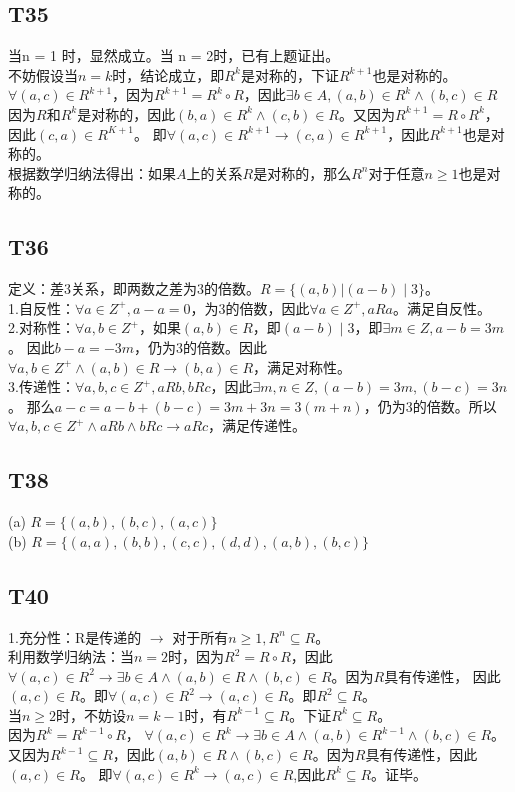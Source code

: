 \documentclass{article}
\begin{document}
\subsection{T35}
当n = 1 时，显然成立。当 n = 2时，已有上题证出。\\
不妨假设当$n = k$时，结论成立，即$R^k$是对称的，下证$R^{k + 1}$也是对称的。\\
$\forall (a, c) \in R^{k + 1}$，因为$R^{k + 1} = R^{k} \circ R$，因此$\exists b \in A, (a ,b) \in R^k \land (b, c) \in R$
因为$R$和$R^k$是对称的，因此$(b, a) \in R^k \land (c, b) \in R$。又因为$R^{k + 1} = R \circ R^k$，因此$(c, a) \in R^{K + 1}$。
即$\forall (a, c) \in R^{k + 1} \rightarrow (c, a) \in R^{k + 1}$，因此$R^{k + 1}$也是对称的。\\
根据数学归纳法得出：如果$A$上的关系$R$是对称的，那么$R^n$对于任意$n \geq 1$也是对称的。
\subsection{T36}
定义：差3关系，即两数之差为3的倍数。$R = \{(a, b) | (a - b) \mid 3\}$。\\
1.自反性：$\forall a \in Z^{+}, a - a = 0$，为3的倍数，因此$\forall a \in Z^{+}, a R a$。满足自反性。\\
2.对称性：$\forall a, b \in Z^{+}$，如果$(a, b) \in R$，即$(a - b) \mid 3$，即$\exists m \in Z, a - b = 3m$。
因此$b - a = -3m$，仍为3的倍数。因此$\forall a, b \in Z^{+} \land (a, b)\in R \rightarrow (b, a) \in R$，满足对称性。\\
3.传递性：$\forall a, b, c \in Z^{+}, a R b, b R c$，因此$\exists m, n\in Z, (a - b) = 3m, (b - c) = 3n$。
那么$a - c = a - b + (b - c) = 3m + 3n = 3(m + n)$，仍为3的倍数。所以$\forall a, b, c \in Z^{+} \land aRb \land bRc 
\rightarrow a R c$，满足传递性。
\subsection{T38}
(a) $R = \{(a, b), (b, c), (a, c)\}$\\
(b) $R = \{(a, a), (b, b), (c, c), (d, d), (a, b), (b, c)\}$
\subsection{T40}
1.充分性：R是传递的 $\rightarrow$ 对于所有$n \geq 1, R^n \subseteq R$。\\
利用数学归纳法：当$n = 2$时，因为$R^2 = R \circ R$，因此$\forall (a, c) \in R^2
\rightarrow \exists b \in A \land (a, b) \in R \land (b, c) \in R$。因为$R$具有传递性，
因此$(a, c) \in R$。即$\forall (a, c) \in R^2 \rightarrow (a, c) \in R$。即$R^2 \subseteq R$。\\
当$n \geq 2$时，不妨设$n = k - 1$时，有$R^{k - 1} \subseteq R$。下证$R^k \subseteq R$。\\
因为$R^k = R^{k - 1} \circ R$， $\forall (a, c) \in R^k \rightarrow \exists b \in A \land (a, b) \in R^{k - 1} \land (b, c) \in R$。
又因为$R^{k - 1} \subseteq R$，因此$(a, b) \in R \land (b, c) \in R$。因为$R$具有传递性，因此$(a, c) \in R$。
即$\forall (a, c) \in R^k \rightarrow (a, c) \in R$,因此$R^k \subseteq R$。证毕。
\end{document}

